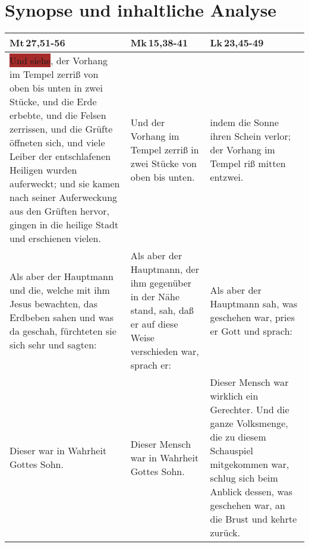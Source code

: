 
\section{Synopse und inhaltliche Analyse}
\begin{center}
\begin{longtable}{p{4cm}|p{4cm}|p{4cm}}
\hline
\textbf{Mt\,27,51-56} & \textbf{Mk\,15,38-41} & \textbf{Lk\,23,45-49} \\
\hline

\endhead

\colorbox{brown}{Und siehe}, der Vorhang im Tempel zerriß von oben bis unten in zwei Stücke, und die Erde erbebte, und die Felsen zerrissen, und die Grüfte öffneten sich, und viele Leiber der entschlafenen Heiligen wurden auferweckt; und sie kamen nach seiner Auferweckung aus den Grüften hervor, gingen in die heilige Stadt und erschienen vielen.

&

Und der Vorhang im Tempel zerriß in zwei Stücke von oben bis unten.

&

indem die Sonne ihren Schein verlor; der Vorhang im Tempel riß mitten entzwei.

\\

Als aber der Hauptmann und die, welche mit ihm Jesus bewachten, das Erdbeben sahen und was da geschah, fürchteten sie sich sehr und sagten:

&

Als aber der Hauptmann, der ihm gegenüber in der Nähe stand, sah, daß er auf diese Weise verschieden war,
sprach er:

&

Als aber der Hauptmann sah, was geschehen war, pries er Gott und sprach:

\\

Dieser war in Wahrheit Gottes Sohn.

&

Dieser Mensch war in Wahrheit Gottes Sohn.

&

Dieser Mensch war wirklich ein Gerechter. Und die ganze Volksmenge, die zu diesem Schauspiel mitgekommen war, schlug sich beim Anblick dessen, was geschehen war, an die Brust und kehrte zurück.

\\


\end{longtable}
\end{center}
